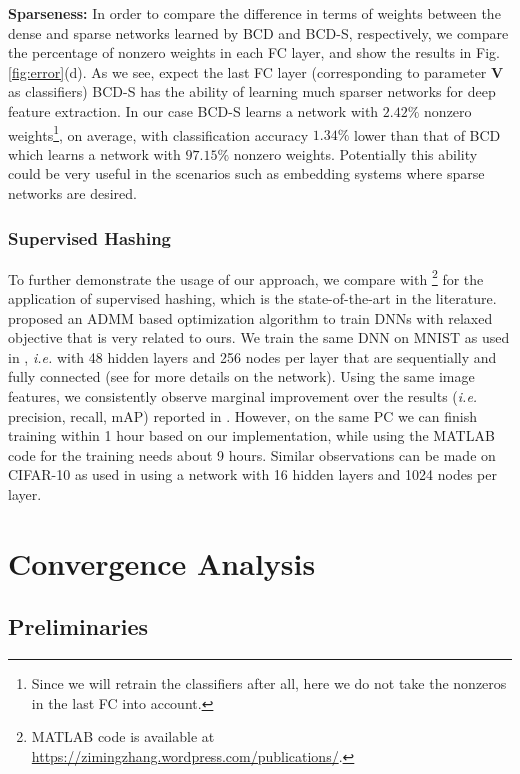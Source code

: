\documentclass{article}
\def\ie{\emph{i.e. }}
\begin{document}
{\bf Sparseness:} In order to compare the difference in terms of weights between the dense and sparse networks learned by BCD and BCD-S, respectively, we compare the percentage of nonzero weights in each FC layer, and show the results in Fig. \ref{fig:error}(d). As we see, expect the last FC layer (corresponding to parameter $\mathbf{V}$ as classifiers) BCD-S has the ability of learning much sparser networks for deep feature extraction. In our case BCD-S learns a network with $2.42\%$ nonzero weights\footnote{Since we will retrain the classifiers after all, here we do not take the nonzeros in the last FC into account.}, on average, with classification accuracy $1.34\%$ lower than that of BCD which learns a network with $97.15\%$ nonzero weights. Potentially this ability could be very useful in the scenarios such as embedding systems where sparse networks are desired.

\subsubsection{Supervised Hashing}
To further demonstrate the usage of our approach, we compare with \cite{Zhang_2016_CVPR}\footnote{MATLAB code is available at \url{https://zimingzhang.wordpress.com/publications/}.} for the application of supervised hashing, which is the state-of-the-art in the literature. \cite{Zhang_2016_CVPR} proposed an ADMM based optimization algorithm to train DNNs with relaxed objective that is very related to ours. We train the same DNN on MNIST as used in \cite{Zhang_2016_CVPR}, \ie with 48 hidden layers and 256 nodes per layer that are sequentially and fully connected (see \cite{Zhang_2016_CVPR} for more details on the network). Using the same image features, we consistently observe marginal improvement over the results (\ie precision, recall, mAP) reported in \cite{Zhang_2016_CVPR}. However, on the same PC we can finish training within 1 hour based on our implementation, while using the MATLAB code for \cite{Zhang_2016_CVPR} the training needs about 9 hours. Similar observations can be made on CIFAR-10 as used in \cite{Zhang_2016_CVPR} using a network with 16 hidden layers and 1024 nodes per layer.


\section{Convergence Analysis}\label{sec:convergence}

\subsection{Preliminaries}\label{ssec:preliminaries}
		
\end{document}
